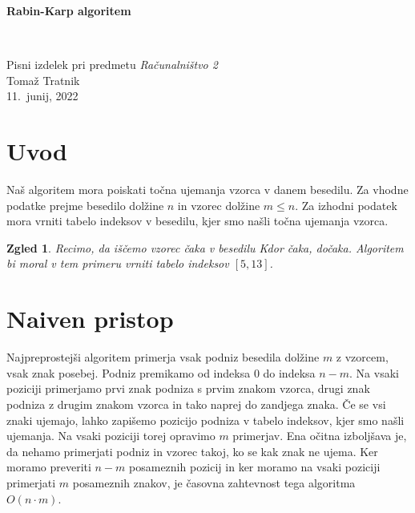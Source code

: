 \documentclass[12pt]{article}
\newtheorem{Zgled}[Izrek]{{\sc Zgled}}
\newenvironment{zgled}{\begin{Zgled}\rm}{\end{Zgled}}
\begin{document}
\thispagestyle{empty}
\begin{center}
\begin{Large}
{\bf Rabin-Karp algoritem}
\end{Large}
\\[5mm]
\begin{large}
Pisni izdelek pri predmetu {\em Računalništvo 2}
\\[5mm]
{\sc Tomaž Tratnik}
\\[10mm]
11.~junij, 2022
\end{large}

\end{center}

\newpage
\setcounter{page}{1}

\section{Uvod}
Naš algoritem mora poiskati točna ujemanja vzorca v danem besedilu. Za vhodne podatke prejme besedilo dolžine $n$ in vzorec dolžine $m \leq n$.
Za izhodni podatek mora vrniti tabelo indeksov v besedilu, kjer smo našli točna ujemanja vzorca.

\begin{zgled}
  Recimo, da iščemo vzorec \textit{čaka} v besedilu \textit{Kdor čaka, dočaka.}
  Algoritem bi moral v tem primeru vrniti tabelo indeksov $[5, 13]$.
\end{zgled}

\section{Naiven pristop}
Najpreprostejši algoritem primerja vsak podniz besedila dolžine $m$ z vzorcem, vsak znak posebej. Podniz premikamo od indeksa $0$ do indeksa $n - m$.
Na vsaki poziciji primerjamo prvi znak podniza s prvim znakom vzorca, drugi znak podniza z drugim znakom vzorca in tako naprej do zandjega znaka.
Če se vsi znaki ujemajo, lahko zapišemo pozicijo podniza v tabelo indeksov, kjer smo našli ujemanja. Na vsaki poziciji torej opravimo $m$ primerjav.
Ena očitna izboljšava je, da nehamo primerjati podniz in vzorec takoj, ko se kak znak ne ujema. Ker moramo preveriti $n - m$ posameznih pozicij
in ker moramo na vsaki poziciji primerjati $m$ posameznih znakov, je časovna zahtevnost tega algoritma $O(n\cdot m)$. 
\end{document}
